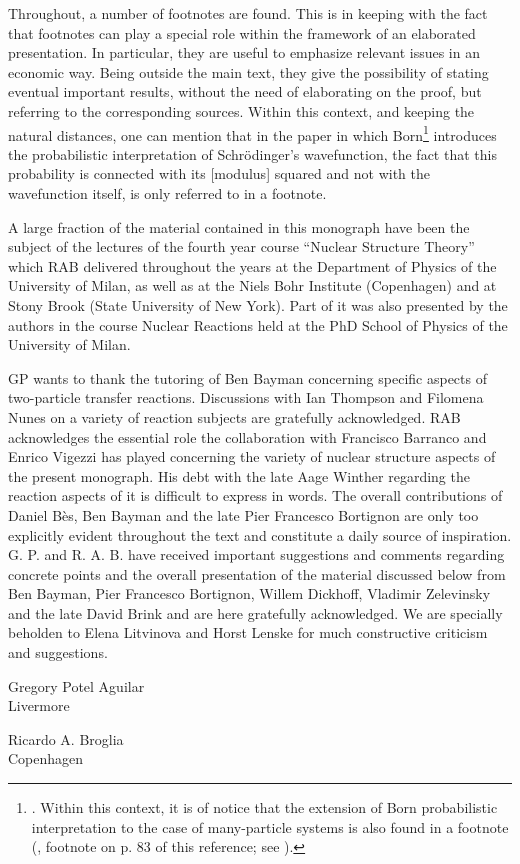 Throughout, a number of footnotes are found. This is in keeping with the fact that footnotes can play a special role within the framework of an elaborated presentation. In particular, they are useful to emphasize relevant issues in an economic way. Being outside the main text, they give the possibility of stating eventual important results, without the need of elaborating on the proof, but referring to the corresponding sources.
 Within this context, and keeping the natural distances, one can mention that in the paper  in which Born\footnote{\cite{Born:26}. Within this context, it is of notice that the extension of Born probabilistic interpretation to the case of many-particle systems is also found in a footnote (\cite{Pauli:27}, footnote on p. 83 of this reference; see  \cite{Pais:86}).} introduces the probabilistic interpretation of Schr\"odinger's  wavefunction, the fact that this probability is connected with its [modulus] squared and not with the wavefunction itself, is only referred to in a footnote.



  A large fraction of the material contained in this monograph have been the subject of the lectures of the fourth year course ``Nuclear Structure Theory'' which RAB delivered throughout the years at the Department of Physics of the University of Milan, as well as at the Niels Bohr Institute (Copenhagen) and at Stony Brook (State University of New York). Part of it was also presented by the authors in the course Nuclear Reactions held at the PhD School of Physics of the University of Milan.

GP wants to thank the tutoring of  Ben Bayman concerning specific aspects of two-particle transfer reactions. Discussions with Ian Thompson and Filomena Nunes on a variety of reaction subjects are gratefully acknowledged. 
RAB  acknowledges the essential role the collaboration with Francisco Barranco and Enrico Vigezzi has played concerning the variety of nuclear structure aspects of the present monograph. His debt with the late Aage Winther regarding the reaction aspects of it is difficult to express in words. The overall contributions of Daniel B\`{e}s, Ben Bayman and the late Pier Francesco Bortignon are only too explicitly evident throughout the text and constitute a daily source of inspiration.  G. P. and R. A. B. have received important suggestions and comments regarding concrete points and the overall presentation of the material discussed below from Ben Bayman, Pier Francesco Bortignon,  Willem Dickhoff,  Vladimir Zelevinsky and the late David Brink and are here gratefully acknowledged. We are specially beholden to Elena Litvinova and Horst Lenske for much constructive criticism and suggestions.
\begin{flushleft}
Gregory Potel Aguilar\\
Livermore
\end{flushleft}
\vspace{-1.7cm}
\begin{flushright}
Ricardo A. Broglia\\
 Copenhagen
\end{flushright}

%
%

